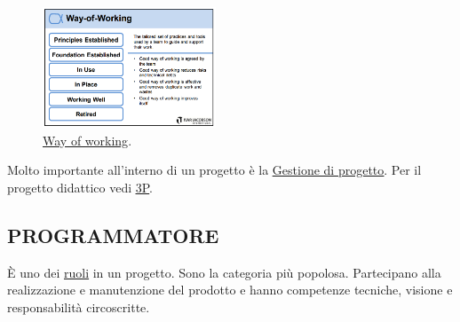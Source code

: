 		\begin{figure}[H]
			\centering
			\includegraphics[width=0.46\textwidth]{img/cards/way}		
			\caption{\underline{\hyperref[way]{Way of working}}.}
		\end{figure} 
			
		Molto importante all'interno di un progetto è la \underline{\hyperref[gestioneprogetto]{Gestione di progetto}}. Per il progetto didattico vedi \underline{\hyperref[3p]{3P}}.
			
		
		\subsection{PROGRAMMATORE}  \label{programmatore}
		È uno dei \underline{\hyperref[ruoli]{ruoli}} in un progetto. Sono la categoria più popolosa. Partecipano alla realizzazione e manutenzione del prodotto e hanno competenze tecniche, visione e responsabilità circoscritte.
		
		
